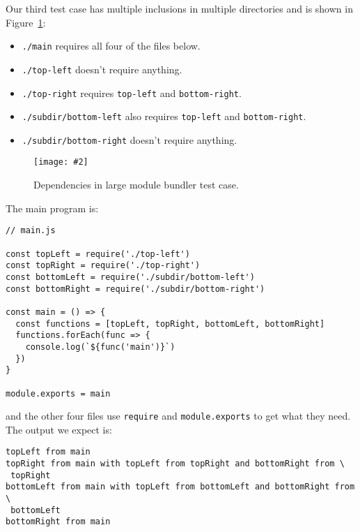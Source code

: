 \documentclass[krantzl]{krantz}
\newcommand{\figpdf}[4]{\begin{figure}%
\centering%
\texttt{[image: \#2]}%
\caption{#3}%
\label{#1}%
\end{figure}}
\newcommand{\figref}[1]{Figure~\ref{#1}}
\begin{document}
Our third test case has multiple inclusions in multiple directories
and is shown in \figref{module-bundler-complicated}:

\begin{itemize}

\item \texttt{./main} requires all four of the files below.

\item \texttt{./top-left} doesn’t require anything.

\item \texttt{./top-right} requires \texttt{top-left} and \texttt{bottom-right}.

\item \texttt{./subdir/bottom-left} also requires \texttt{top-left} and \texttt{bottom-right}.

\item \texttt{./subdir/bottom-right} doesn’t require anything.

\end{itemize}

\figpdf{module-bundler-complicated}{./module-bundler/complicated.pdf}{Dependencies in large module bundler test case.}{0.6}


\noindent The main program is:


\begin{lstlisting}[frame=tblr]
// main.js

const topLeft = require('./top-left')
const topRight = require('./top-right')
const bottomLeft = require('./subdir/bottom-left')
const bottomRight = require('./subdir/bottom-right')

const main = () => {
  const functions = [topLeft, topRight, bottomLeft, bottomRight]
  functions.forEach(func => {
    console.log(`${func('main')}`)
  })
}

module.exports = main
\end{lstlisting}



\noindent and the other four files use \texttt{require} and \texttt{module.exports} to get what they need.
The output we expect is:


\begin{lstlisting}[frame=tblr,backgroundcolor=\color{black!5}]
topLeft from main
topRight from main with topLeft from topRight and bottomRight from \
 topRight
bottomLeft from main with topLeft from bottomLeft and bottomRight from \
 bottomLeft
bottomRight from main
\end{lstlisting}
\end{document}
